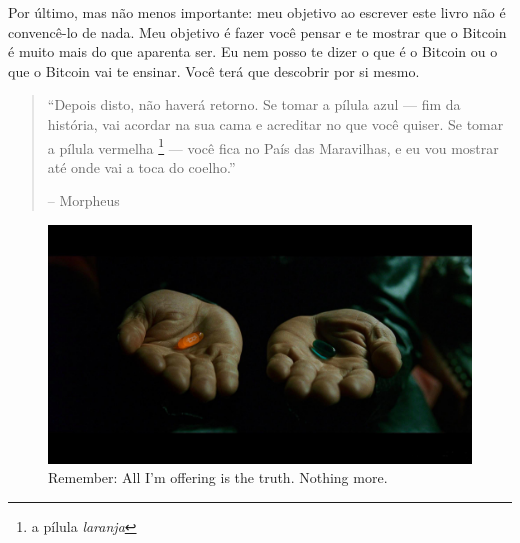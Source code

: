 Por último, mas não menos importante: meu objetivo ao escrever este livro não é convencê-lo de nada. Meu objetivo é fazer você pensar e te mostrar que o Bitcoin é muito mais do que aparenta ser. Eu nem posso te dizer o que é o Bitcoin ou o que o Bitcoin vai te ensinar. Você terá que descobrir por si mesmo.

\begin{quotation}\begin{samepage}
\enquote{Depois disto, não haverá retorno. Se tomar a pílula azul --- fim da história, vai acordar na sua cama e acreditar no que você quiser.  Se tomar a pílula vermelha \footnote{a pílula \textit{laranja}} --- você fica no País das Maravilhas, e eu vou mostrar até onde vai a toca do coelho.}
\begin{flushright} -- Morpheus
\end{flushright}\end{samepage}\end{quotation}

\begin{figure}
  \includegraphics{assets/images/bitcoin-orange-pill.jpg}
  \caption*{Remember: All I'm offering is the truth. Nothing more.}
  \label{fig:bitcoin-orange-pill}
\end{figure}

%
%
%
